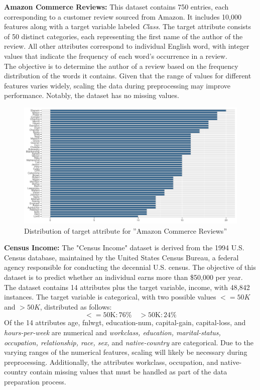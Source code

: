 \documentclass[a4paper,10pt]{article}
\begin{document}
\textbf{Amazon Commerce Reviews:} This dataset contains 750 entries, each corresponding to a customer review sourced from Amazon. It includes 10,000 features along with a target variable labeled \emph{Class}. The target attribute consists of 50 distinct categories, each representing the first name of the author of the review. All other attributes correspond to individual English word, with integer values that indicate the frequency of each word’s occurrence in a review. \\
The objective is to determine the author of a review based on the frequency distribution of the words it contains. Given that the range of values for different features varies widely, scaling the data during preprocessing may improve performance. Notably, the dataset has no missing values.
\begin{figure}[h!]
    \centering
    \includegraphics[width=0.75\linewidth]{amazon/plots/plot_amazon_classes.pdf}
    \caption{Distribution of target attribute for ”Amazon Commerce Reviews”}
    \label{fig:amazondist}
\end{figure}

\textbf{Census Income:} The "Census Income" dataset is derived from the 1994 U.S. Census database, maintained by the United States Census Bureau, a federal agency responsible for conducting the decennial U.S. census. The objective of this dataset is to predict whether an individual earns more than \$50,000 per year. The dataset contains 14 attributes plus the target variable, income, with 48,842 instances. The target variable is categorical, with two possible values $<=50K$ and $>50K$, distributed as follows:
\begin{equation*}
    <=\text{50K:}\,76\% \quad >\text{50K:}\,24\%
\end{equation*}        
Of the 14 attributes {age, fnlwgt, education-num, capital-gain, capital-loss,} and \emph{hours-per-week} are numerical and \emph{workclass, education, marital-status, occupation, relationship, race, sex,} and \emph{native-country} are categorical. Due to the varying ranges of the numerical features, scaling will likely be necessary during preprocessing. Additionally, the attributes workclass, occupation, and native-country contain missing values that must be handled as part of the data preparation process.
\end{document}
